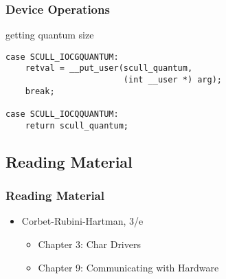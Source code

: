 \documentclass[dvipsnames]{beamer}
\begin{document}
\begin{frame}[fragile]
  \frametitle{Device Operations}

  \begin{exampleblock}{getting quantum size}
    \begin{lstlisting}
case SCULL_IOCGQUANTUM:
    retval = __put_user(scull_quantum,
                        (int __user *) arg);
    break;

case SCULL_IOCQQUANTUM:
    return scull_quantum;
    \end{lstlisting}
  \end{exampleblock}
\end{frame}

\subsection*{Reading Material}

\begin{frame}
  \frametitle{Reading Material}

  \begin{itemize}
    \item Corbet-Rubini-Hartman, 3/e
    \begin{itemize}
      \item Chapter 3: \alert{Char Drivers}
      \item Chapter 9: \alert{Communicating with Hardware}
    \end{itemize}
  \end{itemize}
\end{frame}
\end{document}
